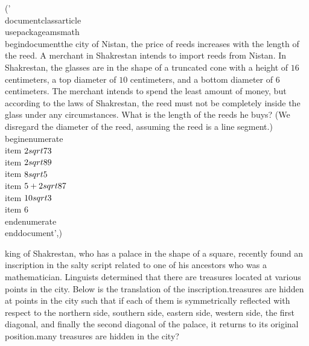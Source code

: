 ('\\documentclass{article}\n\\usepackage{amsmath}\n\\begin{document}\n\nIn the city of Nistan, the price of reeds increases with the length of the reed. A merchant in Shakrestan intends to import reeds from Nistan. In Shakrestan, the glasses are in the shape of a truncated cone with a height of $16$ centimeters, a top diameter of $10$ centimeters, and a bottom diameter of $6$ centimeters. The merchant intends to spend the least amount of money, but according to the laws of Shakrestan, the reed must not be completely inside the glass under any circumstances. What is the length of the reeds he buys? (We disregard the diameter of the reed, assuming the reed is a line segment.)\n\n\\begin{enumerate}\n    \\item $2\\sqrt{73}$\n    \\item $2\\sqrt{89}$\n    \\item $8\\sqrt{5}$\n    \\item $5 + 2\\sqrt{87}$\n    \\item $10\\sqrt{3}$\n    \\item $6$\n\\end{enumerate}\n\n\\end{document}',)
\begin{document}
\n\nThe king of Shakrestan, who has a palace in the shape of a square, recently found an inscription in the salty script related to one of his ancestors who was a mathematician. Linguists determined that there are treasures located at various points in the city. Below is the translation of the inscription.\n\nThe treasures are hidden at points in the city such that if each of them is symmetrically reflected with respect to the northern side, southern side, eastern side, western side, the first diagonal, and finally the second diagonal of the palace, it returns to its original position.\n\nHow many treasures are hidden in the city?\n\n\\[ 8 \\quad (5 \\quad 4 \\quad (4 \\quad 2 \\quad (3 \\quad 1 \\quad (2 \\quad 0 \\quad (1 \\]\n\n\
\end{document}
